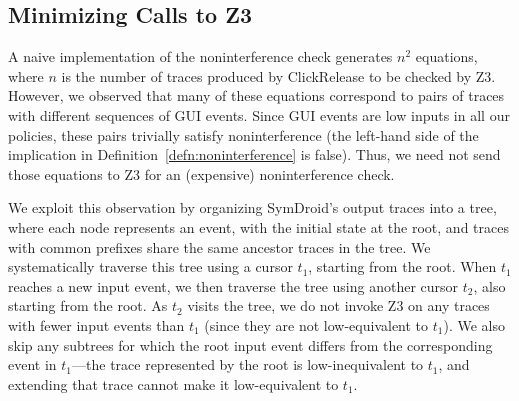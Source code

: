 \documentclass{llncs}
\newcommand{\toolname}{ClickRelease\xspace}
\newcommand{\comment}[3][\color{red}]{{#1{[{#2}: {#3}]}}}
\newcommand{\kris}[1]{\comment[\color{orange}]{kris}{#1}}
\begin{document}

\subsection{Minimizing Calls to Z3}
\label{sec:z3-tree}

A naive implementation of the noninterference check generates $n^2$
equations, where $n$ is the number of traces produced by \toolname{}
to be checked by Z3. However, we observed that many of these equations
correspond to pairs of traces with different sequences of GUI
events. Since GUI events are low inputs in all our policies, these
pairs trivially satisfy noninterference (the left-hand side of the
implication in Definition~\ref{defn:noninterference} is false).
 Thus, we need not send those
equations to Z3 for an (expensive) noninterference check.

We exploit this observation by organizing SymDroid's output traces
into a tree, where each node represents an event, with
the initial state at the root, and traces with common prefixes share the
same ancestor traces in the tree. We systematically traverse this tree
using a cursor $t_1$, starting from the root. When $t_1$ reaches a new
input event, we then traverse the tree using another cursor $t_2$,
also starting from the root. As $t_2$ visits the tree, we do not
invoke Z3 on any traces with fewer input events than $t_1$ (since they
are not low-equivalent to $t_1$). We also skip any subtrees for
which the root input event differs from the corresponding event in
$t_1$---the trace represented by the root is low-inequivalent to $t_1$,
and extending that trace cannot make it low-equivalent to $t_1$.

\end{document}
